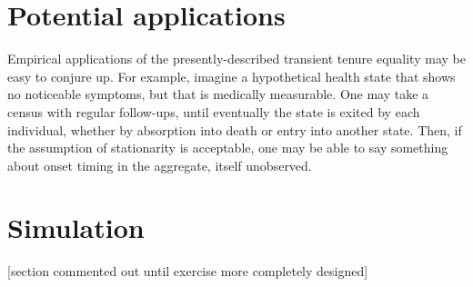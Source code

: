 \documentclass[12pt,oneside,a4paper]{article}
\theoremstyle{definition}
\begin{document}
\section{Potential applications}
Empirical applications of the presently-described transient tenure equality may
be easy to conjure up. For example, imagine a hypothetical health state that
shows no noticeable symptoms, but that is medically measurable. One
may take a census with regular follow-ups, until eventually the state is exited
by each individual, whether by absorption into death or entry into another
state. Then, if the assumption of stationarity is acceptable, one may be able to
say something about onset timing in the aggregate, itself unobserved. %

\section{Simulation}
[section commented out until exercise more completely designed]
% 
% 
% 
\end{document}
